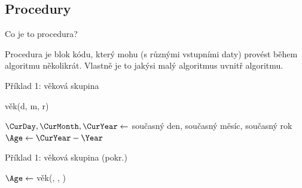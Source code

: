 \documentclass[aspectratio=169,11pt]{beamer}
\let\oldnl\nl
\newcommand{\nonl}{\renewcommand{\nl}{\let\nl\oldnl}}
\begin{document}
\subsection[Procedury]{Procedury}

\begin{frame}{Co je to procedura?}
 \begin{tcolorbox}[title=Procedura,center,width=.9\textwidth]
  Procedura je \alert{blok kódu}, který mohu (s různými vstupními daty) provést
  během algoritmu několikrát. Vlastně je to jakýsi malý algoritmus uvnitř
  algoritmu.
 \end{tcolorbox}
\end{frame}

\begin{frame}{Příklad 1: věková skupina}
 \centering
 \begin{minipage}{.8\textwidth}
  \begin{procedure}[H]
  \DontPrintSemicolon

   \nonl\KwProc věk(d, m, r)\;
   \BlankLine

   \BlankLine

   $\CurDay, \CurMonth, \CurYear \leftarrow$ současný den, současný měsíc,
   současný rok\;
   $\Age \leftarrow \CurYear - \Year$\;

   \pause

   \KwReturn \Age
  \end{procedure}
 \end{minipage}
\end{frame}

\begin{frame}{Příklad 1: věková skupina (pokr.)}
 \centering
 \begin{minipage}{.8\textwidth}
  \begin{algorithm}[H]
   \DontPrintSemicolon
   \BlankLine

   $\Age \leftarrow $ věk(\Day, \Month, \Year)\;
   \pause
   \pause
   \pause
  \end{algorithm}
 \end{minipage}
\end{frame}
\end{document}
